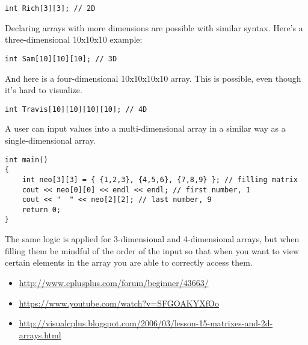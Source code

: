 \begin{lstlisting}
int Rich[3][3]; // 2D
\end{lstlisting}

Declaring arrays with more dimensions are possible with similar syntax. 
Here's a three-dimensional 10x10x10 example:

\begin{lstlisting}
int Sam[10][10][10]; // 3D
\end{lstlisting}

And here is a four-dimensional 10x10x10x10 array. 
This is possible, even though it's hard to visualize.

\begin{lstlisting}
int Travis[10][10][10][10]; // 4D
\end{lstlisting}

A user can input values into a multi-dimensional array in a similar way as a single-dimensional array. 

\begin{lstlisting}
int main()
{
    int neo[3][3] = { {1,2,3}, {4,5,6}, {7,8,9} }; // filling matrix
    cout << neo[0][0] << endl << endl; // first number, 1
    cout << "  " << neo[2][2]; // last number, 9
    return 0;
}
\end{lstlisting}


The same logic is applied for 3-dimensional and 4-dimensional arrays, but when filling them be mindful of the order of the input so that when you want to view certain elements in the array you are able to correctly access them. 






\begin{itemize}
\item \url{http://www.cplusplus.com/forum/beginner/43663/}
\item \url{https://www.youtube.com/watch?v=SFGOAKYXfOo}
\item \url{http://visualcplus.blogspot.com/2006/03/lesson-15-matrixes-and-2d-arrays.html}
\end{itemize}	
